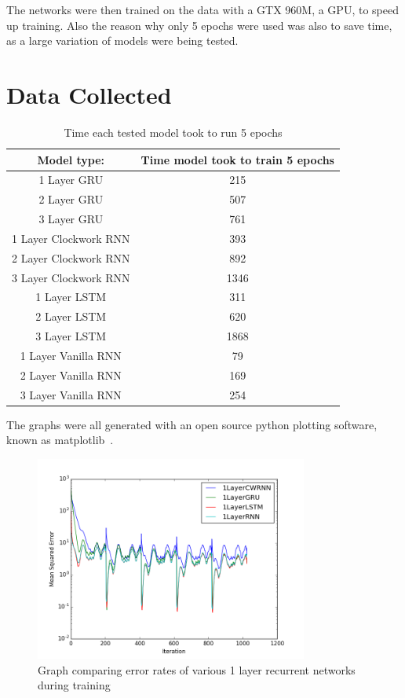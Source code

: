 \documentclass[12pt]{article}
\begin{document}
The networks were then trained on the data with a GTX 960M, a GPU, to speed up
training. Also the reason why only 5 epochs were used was also to save time, as
a large variation of models were being tested.

\section{Data Collected}
\begin{table}[H]
	\begin{tabular}{c|c}
		Model type: & Time model took to train 5 epochs \\\hline
		1 Layer GRU& 215 \\
		2 Layer GRU& 507\\
		3 Layer GRU& 761\\
		1 Layer Clockwork RNN& 393\\
		2 Layer Clockwork RNN& 892\\
		3 Layer Clockwork RNN& 1346\\
		1 Layer LSTM& 311\\
		2 Layer LSTM& 620\\
		3 Layer LSTM& 1868\\
		1 Layer Vanilla RNN& 79\\
		2 Layer Vanilla RNN& 169\\
		3 Layer Vanilla RNN& 254\\
	\end{tabular}
	\caption{Time each tested model took to run 5 epochs}
\end{table}

The graphs were all generated with an open source python plotting software,
known as matplotlib~\cite{matplotlib}.
\begin{figure}[H]
	\includegraphics[width=0.8\textwidth]{1LayerComparison.png}
	\caption{Graph comparing error rates of various 1 layer recurrent networks
	during training}
	\label{fig:1layer}
\end{figure}
\end{document}
